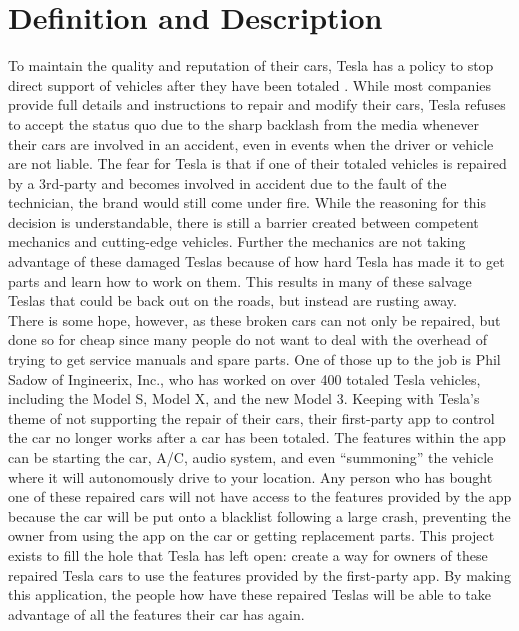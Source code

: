 \documentclass[onecolumn, draftclsnofoot,10pt, compsoc]{IEEEtran}
\begin{document}
\section{Definition and Description}
To maintain the quality and reputation of their cars, Tesla has a policy to stop direct support of vehicles after they have been totaled \cite{1}.
While most companies provide full details and instructions to repair and modify their cars, Tesla refuses to accept the status quo due to the sharp backlash from the media whenever their cars are involved in an accident, even in events when the driver or vehicle are not liable. 
The fear for Tesla is that if one of their totaled vehicles is repaired by a 3rd-party and becomes involved in accident due to the fault of the technician, the brand would still come under fire.
While the reasoning for this decision is understandable, there is still a barrier created between competent mechanics and cutting-edge vehicles.
Further the mechanics are not taking advantage of these damaged Teslas because of how hard Tesla has made it to get parts and learn how to work on them. 
This results in many of these salvage Teslas that could be back out on the roads, but instead are rusting away.
\\ 
There is some hope, however, as these broken cars can not only be repaired, but done so for cheap since many people do not want to deal with the overhead of trying to get service manuals and spare parts.
One of those up to the job is Phil Sadow of Ingineerix, Inc., who has worked on over 400 totaled Tesla vehicles, including the Model S, Model X, and the new Model 3.
Keeping with Tesla’s theme of not supporting the repair of their cars, their first-party app to control the car no longer works after a car has been totaled.\cite{1}
The features within the app can be starting the car, A/C, audio system, and even “summoning” the vehicle where it will autonomously drive to your location.
Any person who has bought one of these repaired cars will not have access to the features provided by the app because the car will be put onto a blacklist following a large crash, preventing the owner from using the app on the car or getting replacement parts.\cite{1} 
This project exists to fill the hole that Tesla has left open: create a way for owners of these repaired Tesla cars to use the features provided by the first-party app.
By making this application, the people how have these repaired Teslas will be able to take advantage of all the features their car has again.
\end{document}
